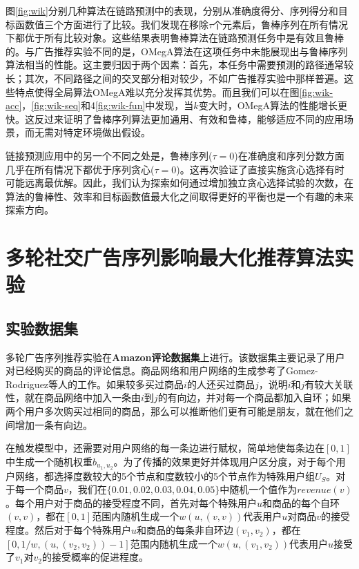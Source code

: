图\ref{fig:wik}分别几种算法在链路预测中的表现，分别从准确度得分、序列得分和目标函数值三个方面进行了比较。我们发现在移除$\tau$个元素后，鲁棒序列在所有情况下都优于所有比较对象。这些结果表明鲁棒算法在链路预测任务中是有效且鲁棒的。与广告推荐实验不同的是，OMegA算法在这项任务中未能展现出与鲁棒序列算法相当的性能。这主要归因于两个因素：首先，本任务中需要预测的路径通常较长；其次，不同路径之间的交叉部分相对较少，不如广告推荐实验中那样普遍。这些特点使得全局算法OMegA难以充分发挥其优势。而且我们可以在图\ref{fig:wik-acc}，\ref{fig:wik-seq}和4\ref{fig:wik-fun}中发现，当$k$变大时，OMegA算法的性能增长更快。这反过来证明了鲁棒序列算法更加通用、有效和鲁棒，能够适应不同的应用场景，而无需对特定环境做出假设。

链接预测应用中的另一个不同之处是，鲁棒序列($\tau=0$)在准确度和序列分数方面几乎在所有情况下都优于序列贪心($\tau=0$)。这再次验证了直接实施贪心选择有时可能远离最优解。因此，我们认为探索如何通过增加独立贪心选择试验的次数，在算法的鲁棒性、效率和目标函数值最大化之间取得更好的平衡也是一个有趣的未来探索方向。



\section{多轮社交广告序列影响最大化推荐算法实验}
\label{sec:5_2}

\subsection{实验数据集}

多轮广告序列推荐实验在{\bfseries Amazon评论数据集}\cite{amazon24}上进行。该数据集主要记录了用户对已经购买的商品的评论信息。商品网络和用户网络的生成参考了Gomez-Rodriguez等人\cite{netgen}的工作。如果较多买过商品$i$的人还买过商品$j$，说明$i$和$j$有较大关联性，就在商品网络中加入一条由$i$到$j$的有向边，并对每一个商品都加入自环；如果两个用户多次购买过相同的商品，那么可以推断他们更有可能是朋友，就在他们之间增加一条有向边。

在触发模型中，还需要对用户网络的每一条边进行赋权，简单地使每条边在$[0,1]$中生成一个随机权重$b_{u_1,u_2}$。为了传播的效果更好并体现用户区分度，对于每个用户网络，都选择度数较大的5个节点和度数较小的5个节点作为特殊用户组$U_S$。对于每一个商品$v$，我们在$\{0.01,0.02,0.03,0.04,0.05\}$中随机一个值作为$revenue(v)$。每个用户对于商品的接受程度不同，首先对每个特殊用户$u$和商品的每个自环$(v,v)$，都在$[0,1]$范围内随机生成一个$w(u,(v,v))$代表用户$u$对商品$v$的接受程度。然后对于每个特殊用户$u$和商品的每条非自环边$(v_1,v_2)$，都在$[0,1/w,(u,(v_2,v_2))-1]$范围内随机生成一个$w(u,(v_1,v_2))$代表用户$u$接受了$v_1$对$v_2$的接受概率的促进程度。

